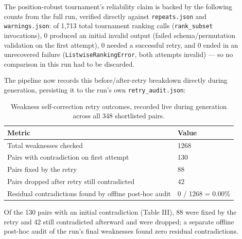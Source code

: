 \documentclass[journal]{IEEEtran}
\begin{document}
The position-robust tournament's reliability claim is backed by the following counts from the full run, verified directly against \texttt{repeats.json} and \texttt{warnings.json}: of 1,713 total tournament ranking calls (\texttt{rank\_subset} invocations), 0 produced an initial invalid output (failed schema/permutation validation on the first attempt), 0 needed a successful retry, and 0 ended in an unrecovered failure (\texttt{ListwiseRankingError}, both attempts invalid) --- so no comparison in this run had to be discarded.

The pipeline now records this before/after-retry breakdown directly during generation, persisting it to the run's own \texttt{retry\_audit.json}:

\begin{table}[!ht]
\caption{Weakness self-correction retry outcomes, recorded live during generation across all 348 shortlisted pairs.}
\label{tab_retry}
\centering
\footnotesize
\begin{tabular}{p{2.0in}p{1.1in}}
\hline
Metric & Value\\
\hline
Total weaknesses checked & 1268\\
Pairs with contradiction on first attempt & 130\\
Pairs fixed by the retry & 88\\
Pairs dropped after retry still contradicted & 42\\
Residual contradictions found by offline post-hoc audit & 0 / 1268 = 0.00\%\\
\hline
\end{tabular}
\end{table}

Of the 130 pairs with an initial contradiction (Table III), 88 were fixed by the retry and 42 still contradicted afterward and were dropped; a separate offline post-hoc audit of the run's final weaknesses found zero residual contradictions.
\end{document}
